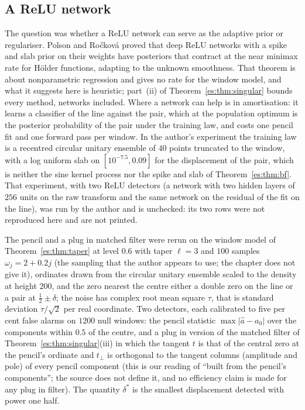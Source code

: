 \subsection{A ReLU network}

The question was whether a ReLU network can serve as the adaptive prior or regulariser. Polson and Ro\v{c}kov\'a \cite{PolsonRockova18} proved that deep ReLU networks with a spike and slab prior on their weights have posteriors that contract at the near minimax rate for H\"older functions, adapting to the unknown smoothness. That theorem is about nonparametric regression and gives no rate for the window model, and what it suggests here is heuristic; part~(ii) of Theorem~\ref{es:thm:singular} bounds every method, networks included. Where a network can help is in amortisation: it learns a classifier of the line against the pair, which at the population optimum is the posterior probability of the pair under the training law, and costs one pencil fit and one forward pass per window. In the author's experiment the training law is a recentred circular unitary ensemble of $40$ points truncated to the window, with a log uniform slab on $[10^{-7.5},0.09]$ for the displacement of the pair, which is neither the sine kernel process nor the spike and slab of Theorem~\ref{es:thm:bf}. That experiment, with two ReLU detectors (a network with two hidden layers of $256$ units on the raw transform and the same network on the residual of the fit on the line), was run by the author and is unchecked: its two rows were not reproduced here and are not printed.

The pencil and a plug in matched filter were rerun on the window model of Theorem~\ref{es:thm:taper} at level $0.6$ with taper $\ell=3$ and $100$ samples $\omega_j=2+0.2j$ (the sampling that the author appears to use; the chapter does not give it), ordinates drawn from the circular unitary ensemble scaled to the density at height $200$, and the zero nearest the centre either a double zero on the line or a pair at $\tfrac12\pm\delta$; the noise has complex root mean square $\tau$, that is standard deviation $\tau/\sqrt2$ per real coordinate. Two detectors, each calibrated to five per cent false alarms on $1200$ null windows: the pencil statistic $\max\lvert\hat a-a_0\rvert$ over the components within $0.5$ of the centre, and a plug in version of the matched filter of Theorem~\ref{es:thm:singular}(iii) in which the tangent $t$ is that of the central zero at the pencil's ordinate and $t_\perp$ is orthogonal to the tangent columns (amplitude and pole) of every pencil component (this is our reading of ``built from the pencil's components''; the source does not define it, and no efficiency claim is made for any plug in filter). The quantity $\delta^*$ is the smallest displacement detected with power one half.

